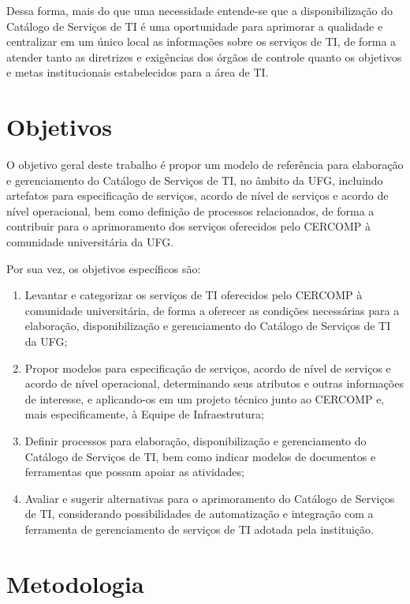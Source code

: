 Dessa forma, mais do que uma necessidade entende-se que a disponibilização do Catálogo de Serviços de TI é uma oportunidade para  aprimorar a qualidade e centralizar em um único local as informações sobre os serviços de TI, de forma a atender tanto as diretrizes e exigências dos órgãos de controle quanto os objetivos e metas institucionais estabelecidos para a área de TI.


\section{Objetivos}
\label{sec:objetivos}

O objetivo geral deste trabalho é propor um modelo de referência para elaboração e gerenciamento do Catálogo de Serviços de TI, no âmbito da UFG, incluindo artefatos para especificação de serviços, acordo de nível de serviços e acordo de nível operacional, bem como definição de processos relacionados, de forma a contribuir para o aprimoramento dos serviços oferecidos pelo CERCOMP à comunidade universitária da UFG.

Por sua vez, os objetivos específicos são:
\begin{enumerate}
  \item Levantar e categorizar os serviços de TI oferecidos pelo CERCOMP à comunidade universitária, de forma a oferecer as condições necessárias para a elaboração, disponibilização e gerenciamento do Catálogo de Serviços de TI da UFG;
  \item Propor modelos para especificação de serviços, acordo de nível de serviços e acordo de nível operacional, determinando seus atributos e outras informações de interesse, e aplicando-os em um projeto técnico junto ao CERCOMP e, mais especificamente, à Equipe de Infraestrutura;
  \item Definir processos para elaboração, disponibilização e gerenciamento do Catálogo de Serviços de TI, bem como indicar modelos de documentos e ferramentas que possam apoiar as atividades;
  \item Avaliar e sugerir alternativas para o aprimoramento do Catálogo de Serviços de TI, considerando possibilidades de automatização e integração com a ferramenta de gerenciamento de serviços de TI adotada pela instituição.
\end{enumerate}


\section{Metodologia}
\label{sec:metodologia}

